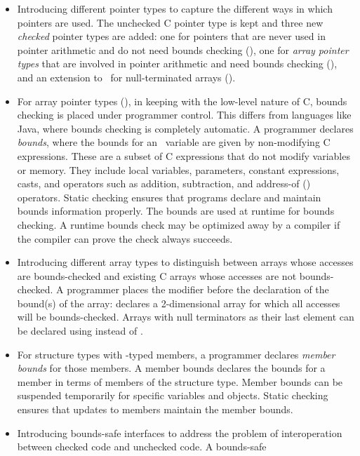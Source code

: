 \begin{itemize}
\item
  Introducing different pointer types to capture the different ways in
  which pointers are used. The unchecked C pointer type \code{*} is kept
  and three new {\it checked} pointer types are added: one for pointers
  that are never used in pointer arithmetic and do not need bounds
  checking (\ptr),  one for \emph{array pointer types} that are involved
  in pointer arithmetic and need bounds checking (\arrayptr), and an
  extension to \arrayptr\ for null-terminated arrays (\ntarrayptr).
\item
  For array pointer types (\arrayptr), in keeping with the low-level
  nature of C,  bounds checking is placed under programmer control.
  This differs from languages like
  Java, where bounds checking is completely automatic. A programmer
  declares \emph{bounds}, where the bounds for an \arrayptr\
  variable are given by non-modifying C expressions. These are a subset
  of C expressions that do not modify variables or memory. They include
  local variables, parameters, constant expressions, casts, and
  operators such as addition, subtraction, and address-of (\code{&})
  operators. Static checking ensures that programs declare and maintain
  bounds information properly. The bounds are used at runtime for
  bounds checking.  A runtime bounds check may be optimized away by a
  compiler if the compiler can prove the check always succeeds.
\item
  Introducing different array types to distinguish between arrays whose
  accesses are bounds-checked and existing C arrays whose accesses are
  not bounds-checked. A programmer places the modifier 
  before the declaration of the bound(s) of the array: \code{int x
  checked[5][5]} declares a 2-dimensional array for which all
  accesses will be bounds-checked.  Arrays with null terminators
  as their last element can be declared using 
  instead of \keyword{checked}.
\item
  For structure types with \arrayptr -typed members, a
  programmer declares \emph{member bounds} for those members. A member
  bounds declares the bounds for a member in terms of members of the
  structure type. Member bounds can be suspended temporarily for
  specific variables and objects. Static checking ensures that updates
  to members maintain the member bounds.
\item
  Introducing bounds-safe interfaces to address the problem of
  interoperation between checked code and unchecked code. A bounds-safe

\end{itemize}
